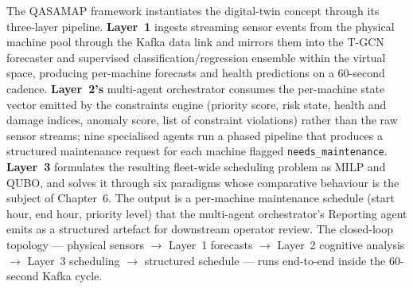 
The QASAMAP framework instantiates the digital-twin concept through its three-layer pipeline. \textbf{Layer~1} ingests streaming sensor events from the physical machine pool through the Kafka data link and mirrors them into the T-GCN forecaster and supervised classification/regression ensemble within the virtual space, producing per-machine forecasts and health predictions on a 60-second cadence. \textbf{Layer~2's} multi-agent orchestrator consumes the per-machine state vector emitted by the constraints engine (priority score, risk state, health and damage indices, anomaly score, list of constraint violations) rather than the raw sensor streams; nine specialised agents run a phased pipeline that produces a structured maintenance request for each machine flagged \texttt{needs\_maintenance}. \textbf{Layer~3} formulates the resulting fleet-wide scheduling problem as MILP and QUBO, and solves it through six paradigms whose comparative behaviour is the subject of Chapter~6. The output is a per-machine maintenance schedule (start hour, end hour, priority level) that the multi-agent orchestrator's Reporting agent emits as a structured artefact for downstream operator review. The closed-loop topology --- physical sensors $\rightarrow$ Layer~1 forecasts $\rightarrow$ Layer~2 cognitive analysis $\rightarrow$ Layer~3 scheduling $\rightarrow$ structured schedule --- runs end-to-end inside the 60-second Kafka cycle.

